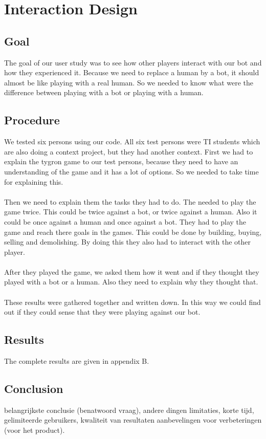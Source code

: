 \section{Interaction Design}

\subsection{Goal}
The goal of our user study was to see how other players interact with our bot and how they experienced it. Because we need to replace a human by a bot, it should almost be like playing with a real human. So we needed to know what were the difference between playing with a bot or playing with a human.

\subsection{Procedure}
We tested six persons using our code.  All six test persons were TI students which are also doing a context project, but they had another context. 
First we had to explain the tygron game to our test persons, because they need to have an understanding of the game and it has a lot of options. So we needed to take time for explaining this. 
\\ \\
Then we need to explain them the tasks they had to do. The needed to play the game twice. This could be twice against a bot, or twice against a human. Also it could be once against a human and once against a bot. They had to play the game and reach there goals in the games. This could be done by building, buying, selling and demolishing. By doing this they also had to interact with the other player. 
\\ \\
After they played the game, we asked them how it went and if they thought they played with a bot or a human. Also they need to explain why they thought that. 
\\ \\
These results were gathered together and written down. In this way we could find out if they could sense that they were playing against our bot.
\subsection{Results}
The complete results are given in appendix B.
\subsection{Conclusion}
belangrijkste conclusie (benatwoord vraag), andere dingen
limitaties, korte tijd, gelimiteerde gebruikers, kwaliteit van resultaten
aanbevelingen voor verbeteringen (voor het product).
\newpage